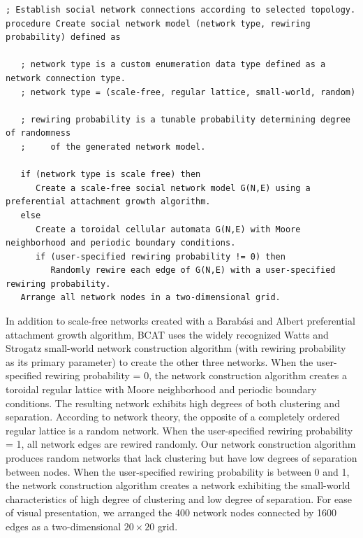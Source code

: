 \documentclass[10pt,letterpaper]{article}
\begin{document}
\begin{algorithm}[!ht]
\caption{\textbf{Pascal-style pseudo-code for network model construction.}}
\label{alg1}
\begin{lstlisting}
; Establish social network connections according to selected topology.
procedure Create social network model (network type, rewiring probability) defined as

   ; network type is a custom enumeration data type defined as a network connection type.
   ; network type = (scale-free, regular lattice, small-world, random)

   ; rewiring probability is a tunable probability determining degree of randomness
   ;     of the generated network model.

   if (network type is scale free) then
      Create a scale-free social network model G(N,E) using a preferential attachment growth algorithm.
   else
      Create a toroidal cellular automata G(N,E) with Moore neighborhood and periodic boundary conditions.
      if (user-specified rewiring probability != 0) then
         Randomly rewire each edge of G(N,E) with a user-specified rewiring probability.
   Arrange all network nodes in a two-dimensional grid.
\end{lstlisting}
\end{algorithm}

In addition to scale-free networks created with a Barab{\'a}si and Albert \cite{Barabasi1999} preferential attachment growth algorithm, BCAT uses the widely recognized Watts and Strogatz \cite{Watts1998} small-world network construction algorithm (with rewiring probability as its primary parameter) to create the other three networks. When the user-specified rewiring probability = 0, the network construction algorithm creates a toroidal regular lattice with Moore neighborhood and periodic boundary conditions. The resulting network exhibits high degrees of both clustering and separation. According to network theory, the opposite of a completely ordered regular lattice is a random network. When the user-specified rewiring probability = 1, all network edges are rewired randomly. Our network construction algorithm produces random networks that lack clustering but have low degrees of separation between nodes. When the user-specified rewiring probability is between 0 and 1, the network construction algorithm creates a network exhibiting the small-world characteristics of high degree of clustering and low degree of separation. For ease of visual presentation, we arranged the 400 network nodes connected by 1600 edges as a two-dimensional $20 \times 20$ grid.
\end{document}
